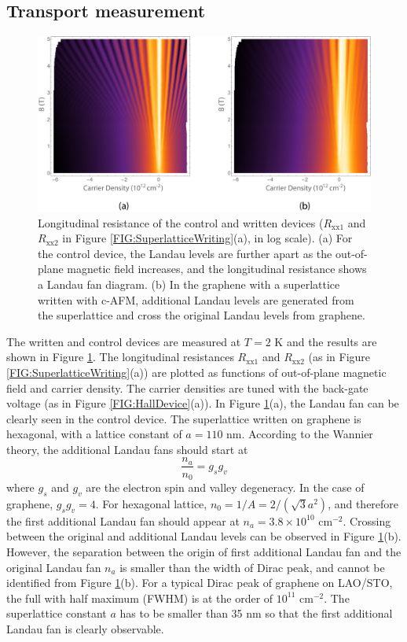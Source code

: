 \documentclass[pdflatex, sectionletters, 12pt]{pittetd}    %
\begin{document}
\subsection{Transport measurement}

\begin{figure}[h!]
	\centering
	\includegraphics[width=1.0\textwidth]{Drawing/SuperlatticeControl.pdf}
	\caption{Longitudinal resistance of the control and written devices ($R_\mathrm{xx1}$ and $R_\mathrm{xx2}$ in Figure \ref{FIG:SuperlatticeWriting}(a), in log scale). (a) For the control device, the Landau levels are further apart as the out-of-plane magnetic field increases, and the longitudinal resistance shows a Landau fan diagram. (b) In the graphene with a superlattice written with c-AFM, additional Landau levels are generated from the superlattice and cross the original Landau levels from graphene.}
	\label{FIG:SuperlatticeControl}
\end{figure}

The written and control devices are measured at $T = 2$ K and the results are shown in Figure \ref{FIG:SuperlatticeControl}. The longitudinal resistances $R_\mathrm{xx1}$ and $R_\mathrm{xx2}$ (as in Figure \ref{FIG:SuperlatticeWriting}(a)) are plotted as functions of out-of-plane magnetic field and carrier density. The carrier densities are tuned with the back-gate voltage (as in Figure \ref{FIG:HallDevice}(a)). In Figure \ref{FIG:SuperlatticeControl}(a), the Landau fan can be clearly seen in the control device. The superlattice written on graphene is hexagonal, with a lattice constant of $a = 110$ nm. According to the Wannier theory, the additional Landau fans should start at\cite{dean2013hofstadter} 
$$
\frac{n_a}{n_0} = g_s g_v
$$
where $g_s$ and $g_v$ are the electron spin and valley degeneracy. In the case of graphene, $g_s g_v = 4$. For hexagonal lattice, $n_0 = 1/A = 2 / (\sqrt{3} a^2)$, and therefore the first additional Landau fan should appear at $n_a = 3.8 \times 10^{10}$ cm$^{-2}$. Crossing between the original and additional Landau levels can be observed in Figure \ref{FIG:SuperlatticeControl}(b). However, the separation between the origin of first additional Landau fan and the original Landau fan $n_a$ is smaller than the width of Dirac peak, and cannot be identified from Figure \ref{FIG:SuperlatticeControl}(b). For a typical Dirac peak of graphene on LAO/STO, the full with half maximum (FWHM) is at the order of $10^{11}$ cm$^{-2}$. The superlattice constant $a$ has to be smaller than 35 nm so that the first additional Landau fan is clearly observable.
\\
\end{document}
